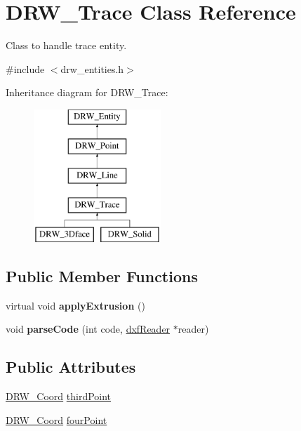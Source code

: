 \hypertarget{classDRW__Trace}{\section{D\-R\-W\-\_\-\-Trace Class Reference}
\label{classDRW__Trace}
}


Class to handle trace entity.  




{\ttfamily \#include $<$drw\-\_\-entities.\-h$>$}

Inheritance diagram for D\-R\-W\-\_\-\-Trace\-:\begin{figure}[H]
\begin{center}
\leavevmode
\includegraphics[height=5.000000cm]{classDRW__Trace}
\end{center}
\end{figure}
\subsection*{Public Member Functions}
\begin{DoxyCompactItemize}
\item 
\hypertarget{classDRW__Trace_ad5c6dedeebd12bc17a93e0d759914fb4}{virtual void {\bfseries apply\-Extrusion} ()}\label{classDRW__Trace_ad5c6dedeebd12bc17a93e0d759914fb4}

\item 
\hypertarget{classDRW__Trace_ae335a16091db77f7a818c18202d82211}{void {\bfseries parse\-Code} (int code, \hyperlink{classdxfReader}{dxf\-Reader} $\ast$reader)}\label{classDRW__Trace_ae335a16091db77f7a818c18202d82211}

\end{DoxyCompactItemize}
\subsection*{Public Attributes}
\begin{DoxyCompactItemize}
\item 
\hyperlink{classDRW__Coord}{D\-R\-W\-\_\-\-Coord} \hyperlink{classDRW__Trace_adadabbf354ee19cfe3869c790e6de3ec}{third\-Point}
\item 
\hyperlink{classDRW__Coord}{D\-R\-W\-\_\-\-Coord} \hyperlink{classDRW__Trace_a96d7a3b877a7f26f6a8b8cdbc9ced660}{four\-Point}
\end{DoxyCompactItemize}
